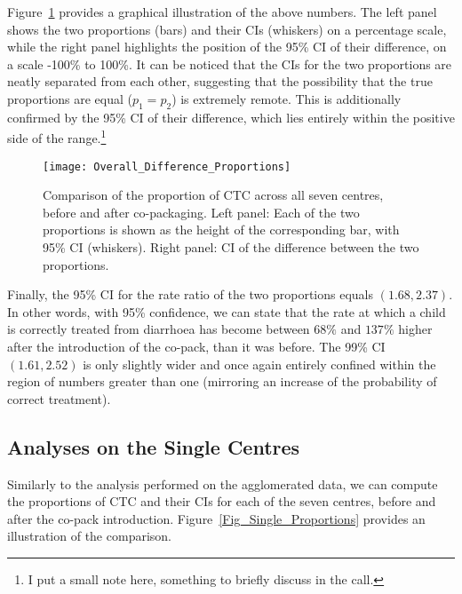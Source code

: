 \documentclass[a4paper, 12pt]{article}
\begin{document}
Figure~\ref{Fig_Overall_Proportions} provides a graphical illustration of the above numbers.
The left panel shows the two proportions (bars) and their CIs (whiskers) on a percentage scale, while the right panel highlights the position of the 95\% CI of their difference, on a scale -100\% to 100\%.
It can be noticed that the CIs for the two proportions are neatly separated from each other, suggesting that the possibility that the true proportions are equal ($p_1=p_2$) is extremely remote. This is additionally confirmed by the 95\% CI of their difference, which lies entirely within the positive side of the range.\footnote{I put a small note here, something to briefly discuss in the call.}






\begin{figure}
\texttt{[image: Overall\_Difference\_Proportions]}
\caption{Comparison of the proportion of CTC across all seven centres, before and after co-packaging. 
Left panel: Each of the two proportions is shown as the height of the corresponding bar, with 95\% CI (whiskers). Right panel: CI of the difference between the two proportions.}
\label{Fig_Overall_Proportions}
\end{figure}

Finally, the 95\% CI for the rate ratio of the two proportions equals $(1.68, 2.37)$. 
In other words, with 95\% confidence, we can state that
the rate at which a child is correctly treated from diarrhoea has become between $68\%$ and $137\%$ higher after the introduction of the co-pack, than it was before.
The 99\% CI $(1.61, 2.52)$ is only slightly wider and once again entirely confined within the region of numbers greater than one (mirroring an increase of the probability of correct treatment).




\subsection{Analyses on the Single Centres}
Similarly to the analysis performed on the agglomerated data, we can compute the proportions of CTC and their CIs for each of the seven centres, before and after the co-pack introduction. 
Figure~\ref{Fig_Single_Proportions} provides an illustration of the comparison.
\end{document}
